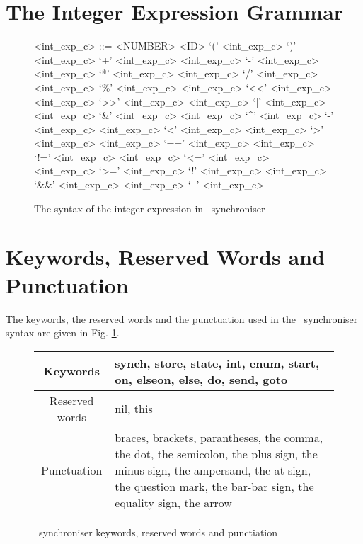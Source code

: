     \section{The Integer Expression Grammar\label{int_exp_gr}}
\setlength{\grammarindent}{8em} %
\begin{figure}%
\scriptsize
\begin{grammar}
<int\_exp\_c> ::= <NUMBER>
                \alt <ID>
                \alt `(' <int\_exp\_c> `)'
                \alt <int\_exp\_c> `+' <int\_exp\_c>
                \alt <int\_exp\_c> `-' <int\_exp\_c>
                \alt <int\_exp\_c> `*' <int\_exp\_c>
                \alt <int\_exp\_c> `/' <int\_exp\_c>
                \alt <int\_exp\_c> `\%' <int\_exp\_c>
                \alt <int\_exp\_c> `<<' <int\_exp\_c>
                \alt <int\_exp\_c> `>>' <int\_exp\_c>
                \alt <int\_exp\_c> `|' <int\_exp\_c>
                \alt <int\_exp\_c> `&' <int\_exp\_c>
                \alt <int\_exp\_c> `^' <int\_exp\_c>
                \alt `-' <int\_exp\_c> %
                \alt <int\_exp\_c> `<' <int\_exp\_c>
                \alt <int\_exp\_c> `>' <int\_exp\_c>
                \alt <int\_exp\_c> `==' <int\_exp\_c>
                \alt <int\_exp\_c> `!=' <int\_exp\_c>
                \alt <int\_exp\_c> `<=' <int\_exp\_c>
                \alt <int\_exp\_c> `>=' <int\_exp\_c>
                \alt `!' <int\_exp\_c>
                \alt <int\_exp\_c> `&&' <int\_exp\_c>
                \alt <int\_exp\_c> `||' <int\_exp\_c>
\end{grammar}
\caption{The syntax of the integer expression in \ak\ synchroniser}
\end{figure}


    \section{Keywords, Reserved Words and Punctuation\label{sync_kw}}
The keywords, the reserved words and the punctuation used in the \ak\ synchroniser syntax are given in Fig. \ref{fig:sync_kw}.
\begin{figure}%
\centering
\begin{tabular}{|c|p{}|}
\hline
Keywords & synch, store, state, int, enum, start, on, elseon, else, do, send, goto\\
\hline
Reserved words & nil, this\\
\hline
Punctuation & braces, brackets, parantheses, the comma, the dot, the semicolon, the plus sign, the minus sign, the ampersand, the at sign, the question mark, the bar-bar sign, the equality sign, the arrow\\
\hline
\end{tabular}
\caption{\ak\ synchroniser keywords, reserved words and punctiation\label{fig:sync_kw}}
\end{figure}


